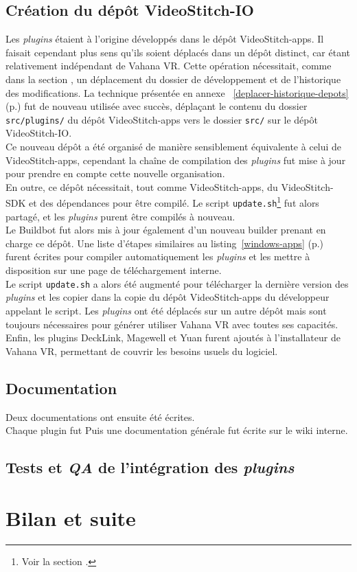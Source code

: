 \subsection{Création du dépôt VideoStitch-IO}
Les \textit{plugins} étaient à l'origine développés dans le dépôt VideoStitch-apps. Il faisait
cependant plus sens qu'ils soient déplacés dans un dépôt distinct, car étant relativement indépendant
de Vahana VR. Cette opération nécessitait, comme dans la section , un déplacement du dossier
de développement et de l'historique des modifications. La technique présentée en annexe~
\ref{deplacer-historique-depots} (p.\pageref{deplacer-historique-depots}) fut de
nouveau utilisée avec succès, déplaçant le contenu du dossier \texttt{src/plugins/}
du dépôt VideoStitch-apps vers le dossier \texttt{src/} sur le dépôt VideoStitch-IO.\\
\newline
Ce nouveau dépôt a été organisé de manière sensiblement équivalente à celui de VideoStitch-apps, 
cependant la chaîne de compilation des \textit{plugins} fut mise à jour pour prendre en compte
cette nouvelle organisation.\\
En outre, ce dépôt nécessitait, tout comme VideoStitch-apps, du VideoStitch-SDK et des dépendances
pour être compilé. Le script \texttt{update.sh}\footnote{Voir la section .}
fut alors partagé, et les \textit{plugins} purent être compilés à nouveau.\\
\newline
Le Buildbot fut alors mis à jour également d'un nouveau builder prenant en charge ce dépôt.
Une liste d'étapes similaires au listing~\ref{windows-apps} (p.\pageref{windows-apps}) furent écrites pour
compiler automatiquement les \textit{plugins} et les mettre à disposition sur une page de 
téléchargement interne.\\
Le script \texttt{update.sh} a alors été augmenté pour télécharger
la dernière version des \textit{plugins} et les copier dans la copie du dépôt VideoStitch-apps
du développeur appelant le script. Les \textit{plugins} ont été déplacés sur un autre dépôt
mais sont toujours nécessaires pour générer utiliser Vahana VR avec toutes ses
capacités.\\
Enfin, les plugins DeckLink, Magewell et Yuan furent ajoutés à l'installateur de Vahana VR, 
permettant de couvrir les besoins usuels du logiciel.

\subsection{Documentation}
Deux documentations ont ensuite été écrites.\\
Chaque plugin fut
Puis une documentation générale fut écrite sur le wiki interne. 

\subsection{Tests et \textit{QA} de l'intégration des \textit{plugins}}


\section{Bilan et suite}

